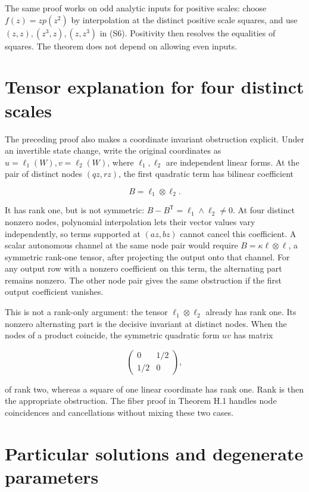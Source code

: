 The same proof works on odd analytic inputs for positive scales: choose
\(f(z)=z p(z^2)\) by interpolation at the distinct positive scale
squares, and use \((z,z),(z^3,z),(z,z^3)\) in (S6). Positivity then
resolves the equalities of squares. The theorem does not depend on
allowing even inputs.

\hypertarget{v11-coupled_structure_full-tensor-explanation-for-four-distinct-scales}{%
\section{Tensor explanation for four distinct
scales}\label{v11-coupled_structure_full-tensor-explanation-for-four-distinct-scales}}

The preceding proof also makes a coordinate invariant obstruction
explicit. Under an invertible state change, write the original
coordinates as \(u=\ell_1(W),v=\ell_2(W)\), where \(\ell_1,\ell_2\) are
independent linear forms. At the pair of distinct nodes \((qz,rz)\), the
first quadratic term has bilinear coefficient

\[
B=\ell_1\otimes\ell_2.
\]

It has rank one, but is not symmetric:
\(B-B^{\mathsf T}=\ell_1\wedge\ell_2\ne0\). At four distinct nonzero
nodes, polynomial interpolation lets their vector values vary
independently, so terms supported at \((az,bz)\) cannot cancel this
coefficient. A scalar autonomous channel at the same node pair would
require \(B=\kappa\ell\otimes\ell\), a symmetric rank-one tensor, after
projecting the output onto that channel. For any output row with a
nonzero coefficient on this term, the alternating part remains nonzero.
The other node pair gives the same obstruction if the first output
coefficient vanishes.

This is not a rank-only argument: the tensor \(\ell_1\otimes\ell_2\)
already has rank one. Its nonzero alternating part is the decisive
invariant at distinct nodes. When the nodes of a product coincide, the
symmetric quadratic form \(uv\) has matrix

\[
\begin{pmatrix}0&1/2\\1/2&0\end{pmatrix},
\]

of rank two, whereas a square of one linear coordinate has rank one.
Rank is then the appropriate obstruction. The fiber proof in Theorem H.1
handles node coincidences and cancellations without mixing these two
cases.

\hypertarget{v11-coupled_structure_full-particular-solutions-and-degenerate-parameters}{%
\section{Particular solutions and degenerate
parameters}\label{v11-coupled_structure_full-particular-solutions-and-degenerate-parameters}}

